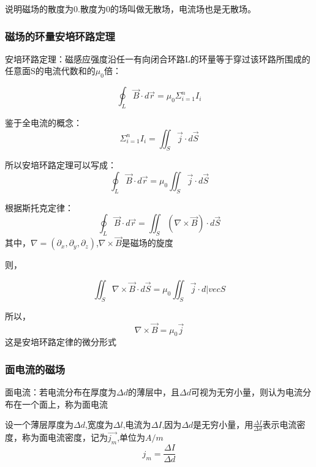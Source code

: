\documentclass[11pt]{ctexart}
\begin{document}
说明磁场的散度为0.散度为0的场叫做无散场，电流场也是无散场。


\subsubsection{磁场的环量安培环路定理}
安培环路定理：磁感应强度沿任一有向闭合环路L的环量等于穿过该环路所围成的任意面S的电流代数和的$\mu_0$倍：

\begin{equation}
    \oint_L \vec{B} \cdot d\vec{r}=\mu_0 \Sigma_{i=1}^n I_i
\end{equation}

鉴于全电流的概念：
\begin{equation}
    \Sigma_{i=1}^n I_i=\iint_S \vec{j} \cdot d\vec{S}
\end{equation}

所以安培环路定理可以写成：
\begin{equation}
    \oint_L \vec{B} \cdot d\vec{r}=\mu_0 \iint_S \vec{j} \cdot d\vec{S}
\end{equation}

根据斯托克定律：
\begin{equation}
    \oint_L \vec{B} \cdot d\vec{r}=\iint_S (\nabla \times \vec{B}) \cdot d\vec{S}
\end{equation}
其中，$\nabla =(\partial_x,\partial_y,\partial_z)$,$\nabla \times \vec{B} $是磁场的旋度

则，

\begin{equation}
    \iint_S \nabla \times \vec{B} \cdot d\vec{S}=\mu_0 \iint_S \vec{j} \cdot d|vec{S}
\end{equation}

所以，
\begin{equation}
    \nabla \times \vec{B}=\mu_0 \vec{j}
\end{equation}
这是安培环路定律的微分形式

\subsubsection{面电流的磁场}
面电流：若电流分布在厚度为$\varDelta d$的薄层中，且$\varDelta d$可视为无穷小量，则认为电流分布在一个面上，称为面电流

设一个薄层厚度为$\varDelta d$,宽度为$\varDelta l$,电流为$\varDelta I$,因为$\varDelta d$是无穷小量，用$\frac{\Delta I}{\Delta d}$表示电流密度，称为面电流密度，记为$\vec{j_m}$,单位为$A/m$
\begin{equation}
    j_m=\frac{\Delta I}{\Delta d} 
\end{equation}
\end{document}
